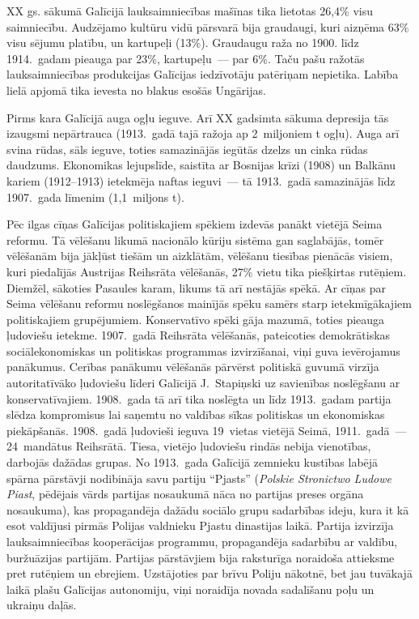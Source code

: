 \documentclass[twoside,a5paper,12pt,fleqn,openany]{extbook}
\newcommand{\pltxti}[1]{\textit{\textpolish{#1}}}
\begin{document}
XX gs. sākumā Galīcijā lauksaimniecības mašīnas tika lietotas 26,4\% visu saimniecību. Audzējamo kultūru vidū pārsvarā bija graudaugi, kuri aizņēma 63\% visu sējumu platību, un kartupeļi (13\%). Graudaugu raža no 1900. līdz 1914.~gadam pieauga par 23\%, kartupeļu~--- par 6\%. Taču pašu ražotās lauksaimniecības produkcijas Galīcijas iedzīvotāju patēriņam nepietika. Labība lielā apjomā tika ievesta no blakus esošās Ungārijas.

Pirms kara Galīcijā auga ogļu ieguve. Arī XX gadsimta sākuma depresija tās izaugsmi nepārtrauca (1913.~gadā tajā ražoja ap 2~miljoniem t ogļu). Auga arī svina rūdas, sāls ieguve, toties samazinājās iegūtās dzelzs un cinka rūdas daudzums. Ekonomikas lejupslīde, saistīta ar Bosnijas krīzi (1908) un Balkānu kariem (1912--1913) ietekmēja naftas ieguvi~--- tā 1913.~gadā samazinājās līdz 1907.~gada līmenim (1,1~miljons t).

Pēc ilgas cīņas Galīcijas politiskajiem spēkiem izdevās panākt vietējā Seima reformu. Tā vēlēšanu likumā nacionālo kūriju sistēma gan saglabājās, tomēr vēlēšanām bija jākļūst tiešām un aizklātām, vēlēšanu tiesības pienācās visiem, kuri piedalījās Austrijas Reihsrāta vēlēšanās, 27\% vietu tika piešķirtas rutēņiem. Diemžēl, sākoties Pasaules karam, likums tā arī nestājās spēkā. Ar cīņas par Seima vēlēšanu reformu noslēgšanos mainījās spēku samērs starp ietekmīgākajiem politiskajiem grupējumiem. Konservatīvo spēki gāja mazumā, toties pieauga ļudoviešu ietekme. 1907.~gadā Reihsrāta vēlēšanās, pateicoties demokrātiskas sociālekonomiskas un politiskas programmas izvirzīšanai, viņi guva ievērojamus panākumus. Cerības panākumu vēlēšanās pārvērst politiskā guvumā virzīja autoritatīvāko ļudoviešu līderi Galīcijā J.~Stapiņski uz savienības noslēgšanu ar konservatīvajiem. 1908.~gada tā arī tika noslēgta un līdz 1913.~gadam partija slēdza kompromisus lai saņemtu no valdības sīkas politiskas un ekonomiskas piekāpšanās. 1908.~gadā ļudovieši ieguva 19~vietas vietējā Seimā, 1911.~gadā~--- 24~mandātus Reihsrātā. Tiesa, vietējo ļudoviešu rindās nebija vienotības, darbojās dažādas grupas. No 1913.~gada Galīcijā zemnieku kustības labējā spārna pārstāvji nodibināja savu partiju ``Pjasts'' (\pltxti{Polskie Stronictwo Ludowe Piast}, pēdējais vārds partijas nosaukumā nāca no partijas preses orgāna nosaukuma), kas propagandēja dažādu sociālo grupu sadarbības ideju, kura it kā esot valdījusi pirmās Polijas valdnieku Pjastu dinastijas laikā. Partija izvirzīja lauksaimniecības kooperācijas programmu, propagandēja sadarbību ar valdību, buržuāzijas partijām. Partijas pārstāvjiem bija raksturīga noraidoša attieksme pret rutēņiem un ebrejiem. Uzstājoties par brīvu Poliju nākotnē, bet jau tuvākajā laikā plašu Galīcijas autonomiju, viņi noraidīja novada sadalīšanu poļu un ukraiņu daļās.
\end{document}
